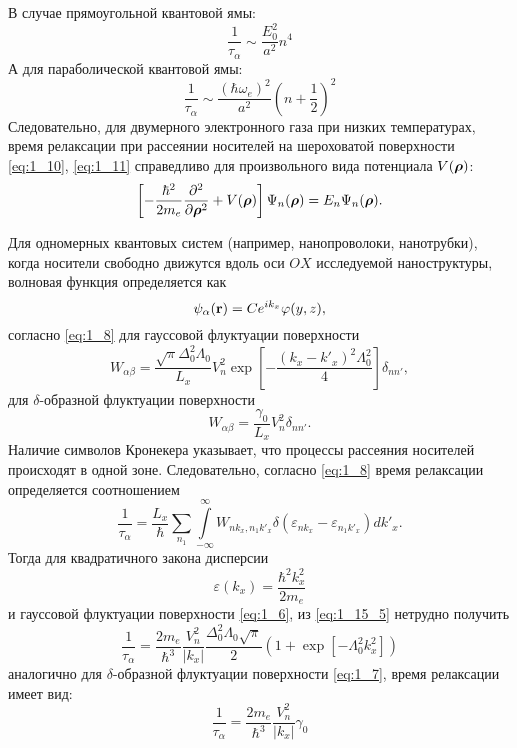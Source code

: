 В случае прямоугольной квантовой ямы:
\begin{equation}
\frac{1}{\tau_\alpha} \sim \frac{E_0^2}{a^2} n^4 
\end{equation}
А для параболической квантовой ямы:
\begin{equation} \label{eq:1_14}
\frac{1}{\tau_\alpha} \sim \frac{(\hbar\omega_e)^2}{a^2}{\left(n + \frac{1}{2}\right)}^2
\end{equation}
Следовательно, для двумерного электронного газа при низких температурах, время релаксации при рассеянии носителей на шероховатой поверхности \eqref{eq:1_10}, \eqref{eq:1_11} справедливо для произвольного вида потенциала $V(\boldsymbol{\mathbf{\rho}})$:
\[
\left[-\frac{\hbar^2}{2m_e}\frac{\partial^2}{\partial \boldsymbol{\mathbf{\rho}}^2}+V(\boldsymbol{\mathbf{\rho}})\right]\Psi_n(\boldsymbol{\mathbf{\rho}})=E_n\Psi_n(\boldsymbol{\mathbf{\rho}}).
\]

Для одномерных квантовых систем (например, нанопроволоки, нанотрубки), когда носители свободно движутся вдоль оси $OX$ исследуемой наноструктуры, волновая функция определяется как
\[
\psi_\alpha(\boldsymbol{\mathbf{r}})=Ce^{ik_x}\varphi(y,z),
\]
согласно \eqref{eq:1_8} для гауссовой флуктуации поверхности
\begin{equation}
W_{\alpha\beta }=\frac{\sqrt{\pi}\Delta^2_0\Lambda_0}{L_x}  V_n^2 \exp\left[-\frac{(k_x-k'_x)^2\Lambda^2_0}{4}\right] \delta_{nn'},
\end{equation}
для $\delta$-образной флуктуации поверхности
\begin{equation}
W_{\alpha\beta }=\frac{\gamma_0}{L_x} V_n^2 \delta_{nn'}.
\end{equation}
Наличие символов Кронекера указывает, что процессы рассеяния носителей происходят в одной зоне. Следовательно, согласно \eqref{eq:1_8} время релаксации определяется соотношением
\begin{equation} \label{eq:1_15_5}
\frac{1}{\tau_\alpha}=\frac{L_x}{\hbar }\sum\limits_{n_1}\int\limits^\infty_{-\infty }{W_{n k_x, n_1 k'_x}\delta(\varepsilon_{n k_x}-\varepsilon_{n_1 k'_x})dk'_x}.
\end{equation}
Тогда для квадратичного закона дисперсии
\[
\varepsilon(k_x)=\frac{\hbar^2 k^2_x}{2m_e} 
\] 
и гауссовой флуктуации поверхности \eqref{eq:1_6}, из \eqref{eq:1_15_5} нетрудно получить  
\begin{equation} \label{eq:1_16}
\frac{1}{\tau_\alpha}=\frac{2 m_e}{\hbar^3} \frac{V_n^2}{\left|k_x\right|} \frac{\Delta^2_0\Lambda_0\sqrt{\pi}}{2} \left(1+\exp\left[-\Lambda^2_0 k^2_x \right] \right)
\end{equation}
аналогично для $\delta$-образной флуктуации поверхности \eqref{eq:1_7}, время релаксации имеет вид:
\begin{equation} \label{eq:1_17}
\frac{1}{\tau_\alpha}=\frac{2 m_e}{\hbar^3} \frac{V_n^2}{\left|k_x\right|}\gamma_0
\end{equation}

